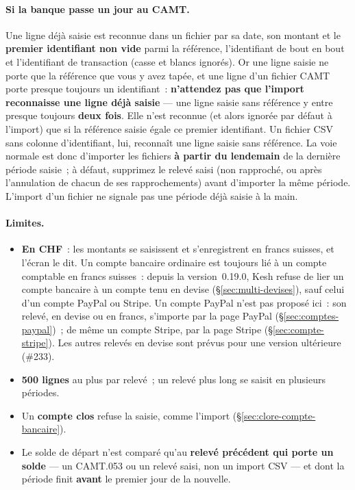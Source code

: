 \documentclass[a4paper,11pt,oneside]{article}
\begin{document}
\paragraph{Si la banque passe un jour au CAMT.} Une ligne déjà saisie est reconnue dans un
fichier par sa date, son montant et le \textbf{premier identifiant non vide} parmi la référence,
l'identifiant de bout en bout et l'identifiant de transaction (casse et blancs ignorés). Or une
ligne saisie ne porte que la référence que vous y avez tapée, et une ligne d'un fichier CAMT
porte presque toujours un identifiant~: \textbf{n'attendez pas que l'import reconnaisse une ligne
déjà saisie} --- une ligne saisie sans référence y entre presque toujours \textbf{deux fois}. Elle
n'est reconnue (et alors ignorée par défaut à l'import) que si la référence saisie égale ce premier
identifiant. Un fichier CSV sans colonne d'identifiant, lui, reconnaît une ligne saisie sans
référence. La voie normale est donc d'importer les fichiers \textbf{à partir du lendemain} de la
dernière période saisie~; à défaut, supprimez le relevé saisi (non rapproché, ou après
l'annulation de chacun de ses rapprochements) avant d'importer la même période. L'import d'un
fichier ne signale pas une période déjà saisie à la main.

\paragraph{Limites.}
\begin{itemize}
    \item \textbf{En CHF}~: les montants se saisissent et s'enregistrent en francs suisses, et
          l'écran le dit. Un compte bancaire ordinaire est toujours lié à un compte comptable en
          francs suisses~: depuis la version~0.19.0, Kesh refuse de lier un compte bancaire à un
          compte tenu en devise (\S\ref{sec:multi-devises}), sauf celui d'un compte PayPal ou Stripe.
          Un compte PayPal n'est pas proposé ici~: son relevé, en devise ou en francs, s'importe
          par la page PayPal (\S\ref{sec:comptes-paypal})~; de même un compte Stripe, par la page
          Stripe (\S\ref{sec:compte-stripe}). Les autres relevés en devise sont
          prévus pour une version ultérieure (\#233).
    \item \textbf{500 lignes} au plus par relevé~; un relevé plus long se saisit en plusieurs
          périodes.
    \item Un \textbf{compte clos} refuse la saisie, comme l'import
          (\S\ref{sec:clore-compte-bancaire}).
    \item Le solde de départ n'est comparé qu'au \textbf{relevé précédent qui porte un solde}
          --- un CAMT.053 ou un relevé saisi, non un import CSV --- et dont la période finit
          \textbf{avant} le premier jour de la nouvelle.
\end{itemize}
\end{document}
